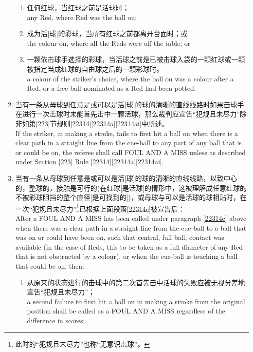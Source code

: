 \begin{enumerate}[label=(\alph*)]
    \begin{enumerate}[label=(\roman*)]
        \item 任何红球，当红球之前是活球时；\\
        any Red, where Red was the ball on;
        \item 成为活[球]的彩球，当所有红球之前都离开台面时；或\\
        the colour on, where all the Reds were off the table; or
        \item 一颗依击球手选择的彩球，当活球之前是已被击球入袋的一颗红球或一颗被指定当成红球的自由球之后的一颗彩球时。\\
        a colour of the striker's choice, where the ball on was a colour after a Red, or a free ball nominated as a Red had been potted.
    \end{enumerate}
    \item \label{22314c}当有一条从母球到任意是或可以是活[球]的球的清晰的直线线路时如果击球手在进行一次击球时未能首先击中一颗活球，那么裁判应宣告``犯规且未尽力''除非如第\ref{223}节规则\ref{22314}\ref{22314a}\ref{22314ai}中所述。\\
    If the striker, in making a stroke, fails to first hit a ball on when there is a clear path in a straight line from the cue-ball to any part of any ball that is or could be on, the referee shall call FOUL AND A MISS unless as described under Section \ref{223} Rule \ref{22314}\ref{22314a}\ref{22314ai}.
    \item \label{22314d}当有一条从母球到任意是或可以是活[球]的球的清晰的直线线路，以致中心的，整球的，接触是可行的(在红球[是活球]的情形中，这被理解成任意红球的不被彩球阻挡的整个直径[是可找到的])，或母球与可以是活球的球相贴时，在一次``犯规且未尽力''\footnote{此时的``犯规且未尽力''也称``无意识击球''。}已根据上面段落\ref{22314c}被宣告后：\\
    After a FOUL AND A MISS has been called under paragraph \ref{22314c} above when there was a clear path in a straight line from the cue-ball to a ball that was on or could have been on, such that central, full ball, contact was available (in the case of Reds, this to be taken as a full diameter of any Red that is not obstructed by a colour), or when the cue-ball is touching a ball that could be on, then:
    \begin{enumerate}[label=(\roman*)]
        \item \label{22314di}从原来的状态进行的击球中的第二次首先击中活球的失败应被无视分差地宣告``犯规且未尽力''；\\
        a second failure to first hit a ball on in making a stroke from the original position shall be called as a FOUL AND A MISS regardless of the difference in scores;

\end{enumerate}
\end{enumerate}
